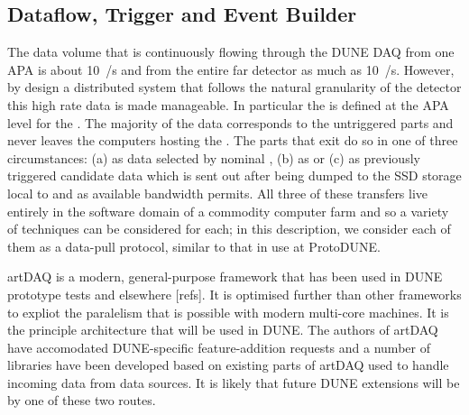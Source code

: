 
\subsection{Dataflow, Trigger and Event Builder}
\label{sec:fd-daq-hlt}


The data volume that is continuously flowing through the DUNE
  DAQ from one APA is about \SI{10}{\GB/\s}
and from the entire far detector as much as \SI{10}{\TB/\s}.
However, by design a distributed system that follows the natural
granularity of the detector this high rate data is made manageable.
In particular the  is defined at the APA level for
the  .
The majority of the data corresponds to the untriggered parts and
never leaves the computers hosting the .
The parts that exit do so in one of three circumstances: (a) as data
selected by nominal , (b) as  or
(c) as previously triggered  candidate data which is
sent out after being dumped to the SSD storage local to
 and as available bandwidth permits. 
All three of these transfers live entirely in the software domain of a
commodity computer farm and so a variety of techniques can be
considered for each; in this description, we consider each of them as
a data-pull protocol, similar to that in use at ProtoDUNE.


artDAQ is a modern, general-purpose framework that has been used in
DUNE prototype tests and elsewhere [refs]. 
It is optimised further than other frameworks to expliot the
paralelism that is possible with modern multi-core machines. 
It is the principle architecture that will be used in DUNE.
The authors of artDAQ have accomodated DUNE-specific feature-addition
requests and a number of libraries have been developed based on
existing parts of artDAQ used to handle incoming data from data
sources. 
It is likely that future DUNE extensions will be by one of these two
routes.

